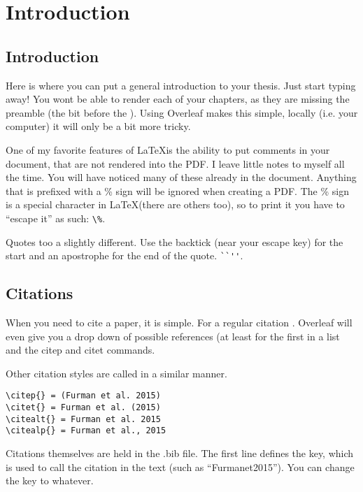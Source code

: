 
\chapter{Introduction} %

\label{Introduction} %

\section{Introduction}
Here is where you can put a general introduction to your thesis. Just start typing away! You wont be able to render each of your chapters, as they are missing the preamble (the bit before the \verb++). Using Overleaf makes this simple, locally (i.e. your computer) it will only be a bit more tricky. 

One of my favorite features of \LaTeX is the ability to put comments in your document, that are not rendered into the PDF. I leave little notes to myself all the time. You will have noticed many of these already in the document. Anything that is prefixed with a \% sign will be ignored when creating a PDF. The \% sign is a special character in \LaTeX (there are others too), so to print it you have to ``escape it'' as such: \verb+\%+.

Quotes too a slightly different. Use the backtick (near your escape key) for the start and an apostrophe for the end of the quote. \verb+``''+. 

\section{Citations}
When you need to cite a paper, it is simple. For a regular citation \citep{Furmanet2015}. Overleaf will even give you a drop down of possible references (at least for the first in a list and the citep and citet commands. 

Other citation styles are called in a similar manner.
\begin{verbatim}
\citep{} = (Furman et al. 2015)
\citet{} = Furman et al. (2015)
\citealt{} = Furman et al. 2015
\citealp{} = Furman et al., 2015
\end{verbatim}

Citations themselves are held in the .bib file. The first line defines the key, which is used to call the citation in the text (such as ``Furmanet2015''). You can change the key to whatever. 

